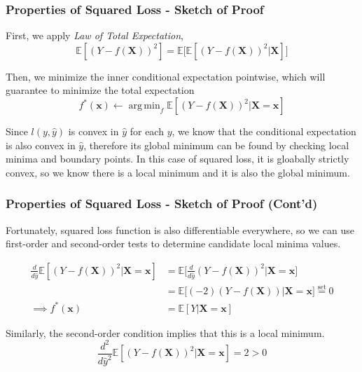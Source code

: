 \documentclass{beamer}
\DeclareMathOperator*{\argmin}{arg\,min}
\begin{document}

\begin{frame}
\frametitle{Properties of Squared Loss - Sketch of Proof}

First, we apply \textit{Law of Total Expectation},
$$
\mathbb{E}[(Y - f(\boldsymbol{X}))^2]
= \mathbb{E}\big[ \mathbb{E}[(Y - f(\boldsymbol{X}))^2 | \boldsymbol{X}] \big]
$$

Then, we minimize the inner conditional expectation pointwise, which will guarantee to minimize the total expectation
$$
f^{*}(\boldsymbol{x}) \leftarrow
\argmin_f \mathbb{E}[(Y - f(\boldsymbol{X}))^2 | \boldsymbol{X} = \boldsymbol{x}]
$$

Since $l(y, \hat{y})$ is convex in $\hat{y}$ for each $y$, we know that the conditional expectation is also convex in $\hat{y}$, therefore its global minimum can be found by checking local minima and boundary points. In this case of squared loss, it is gloabally strictly convex, so we know there is a local minimum and it is also the global minimum.

\end{frame}


\begin{frame}
\frametitle{Properties of Squared Loss - Sketch of Proof (Cont'd)}

Fortunately, squared loss function is also differentiable everywhere, so we can use first-order and second-order tests to determine candidate local minima values.

\begin{align*}
\frac{d}{d \hat{y}} \mathbb{E}[(Y - f(\boldsymbol{X}))^2 | \boldsymbol{X} = \boldsymbol{x}]
&= \mathbb{E}\bigg[ \frac{d}{d \hat{y}} (Y - f(\boldsymbol{X}))^2 | \boldsymbol{X} = \boldsymbol{x} \bigg] \\
&= \mathbb{E}\bigg[ (-2) (Y - f(\boldsymbol{X})) | \boldsymbol{X} = \boldsymbol{x} \bigg]
\stackrel{\text{set}}{=} 0 \\
\implies f^{*}(\boldsymbol{x}) &= \mathbb{E}[Y | \boldsymbol{X} = \boldsymbol{x}]
\end{align*}

Similarly, the second-order condition implies that this is a local minimum.
$$
\frac{d^2}{d \hat{y}^2} \mathbb{E}[(Y - f(\boldsymbol{X}))^2 | \boldsymbol{X} = \boldsymbol{x}] = 2 > 0
$$

\end{frame}
\end{document}
